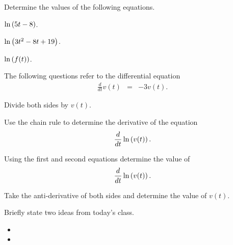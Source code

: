 \begin{problem}
\item Determine the values of the following equations.
  \begin{subproblem}
    \item $\ln\left( 5t-8\right)$.
      \vfill
    \item $\ln\left( 3t^2 - 8t + 19 \right)$.
      \vfill
    \item $\ln\left( f(t) \right)$.
      \vfill
  \end{subproblem}

  \clearpage

\item The following questions refer to the differential equation
  \begin{eqnarray*}
    \frac{d}{dt} v(t) & = & -3 v(t).
  \end{eqnarray*}
  \begin{subproblem}
  \item Divide both sides by $v(t)$.
    \vfill
  \item Use the chain rule to determine the derivative of the equation
    \begin{eqnarray*}
      \frac{d}{dt} \ln\left( v(t) \right).
    \end{eqnarray*}
    \vfill
  \item Using the first and second equations determine the value of 
    \begin{eqnarray*}
      \frac{d}{dt} \ln\left( v(t) \right).
    \end{eqnarray*}
    \vfill
  \item Take the anti-derivative of both sides and determine the value
    of $v(t)$.
    \vfill
  \end{subproblem}

\end{problem}

\postClass

\begin{problem}
\item Briefly state two ideas from today's class.
  \begin{itemize}
  \item 
  \item 
  \end{itemize}
\item 
  \begin{subproblem}
    \item
  \end{subproblem}
\end{problem}



